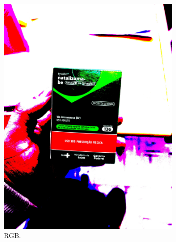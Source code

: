 \begin{figure}[htb]
    \centering
    \caption{Exemplos de componentes analisadas recompondo componentes de \textit{threshold} (%
    ,
    ,
    ,
    ) e destaque nos termos localizados em cada componente (%
    ,
    ,
    ,
    ).}
    \begin{subfigure}[b]{0.21\textwidth}
        \centering
        \caption{RGB.}
        \label{fig:foto:versoes:2:RGB}
        \includegraphics[width=\linewidth]{../pictures/tysabri_rgb_thresh.jpg}
    \end{subfigure}
    \hfill
    \begin{subfigure}[b]{0.21\textwidth}
        \centering

\end{subfigure}
\end{figure}
